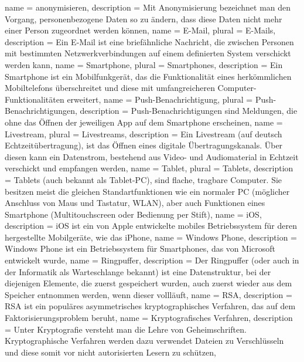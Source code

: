 {
  name = anonymisieren,
  description = {Mit Anonymisierung bezeichnet man den Vorgang, personenbezogene Daten so zu ändern, dass diese Daten nicht mehr einer Person zugeordnet werden können},
}
{
  name = E-Mail,
  plural = E-Mails,
  description = {Ein E-Mail ist eine briefähnliche Nachricht, die zwischen Personen mit bestimmten Netzwerkverbindungen auf einem definierten System verschickt werden kann},
}
{
  name = Smartphone,
  plural = Smartphones,
  description = {Ein Smartphone ist ein Mobilfunkgerät, das die Funktionalität eines herkömmlichen Mobiltelefons überschreitet und diese mit umfangreicheren Computer-Funktionalitäten erweitert},
}
{
  name = Push-Benachrichtigung,
  plural = Push-Benachrichtigungen,
  description = {Push-Benachrichtigungen sind Meldungen, die ohne das Öffnen der jeweiligen \gls{App} auf dem \gls{Smartphone} erscheinen},
}
{
  name = Livestream,
  plural = Livestreams,
  description = {Ein Livestream (auf deutsch Echtzeitübertragung), ist das Öffnen eines digitale Übertragungskanals. Über diesen kann ein Datenstrom, bestehend aus Video- und Audiomaterial in Echtzeit verschickt und empfangen werden},
}
{
  name = Tablet,
  plural = Tablets,
  description = {Tablets (auch bekannt als Tablet-PC), sind flache, tragbare Computer. Sie besitzen meist die gleichen Standartfunktionen wie ein normaler PC (möglicher Anschluss von Maus und Tastatur, WLAN), aber auch Funktionen eines \gls{Smartphone} (Multitouchscreen oder Bedienung per Stift)},
}
{
  name = iOS,
  description = {iOS ist ein von Apple entwickelte mobiles Betriebssystem für deren hergestellte Mobilgeräte, wie das iPhone},
}
{
  name = Windows Phone,
  description = {Windows Phone ist ein Betriebssystem für Smartphones, das von Microsoft entwickelt wurde},
}
{
  name = Ringpuffer,
  description = {Der Ringpuffer (oder auch in der Informatik als Warteschlange bekannt) ist eine Datenstruktur, bei der diejenigen Elemente, die zuerst gespeichert wurden, auch zuerst wieder aus dem Speicher entnommen werden, wenn dieser vollläuft},
}
{
  name = RSA,
  description = {RSA ist ein populäres asymmetrisches kryptographisches Verfahren, das auf dem Faktorisierungsproblem beruht},
}
{
  name = Kryptografisches Verfahren,
  description = {Unter Kryptografie versteht man die Lehre von Geheimschriften. Kryptographische Verfahren werden dazu verwendet Dateien zu Verschlüsseln und diese somit vor nicht autorisierten Lesern zu schützen},
}
